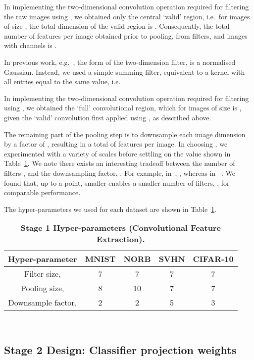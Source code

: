 \documentclass[conference]{IEEEtran}
\begin{document}
In implementing the two-dimensional convolution operation required for filtering the raw images using , we obtained only the central `valid' region, i.e.~for images of size , the total dimension of the valid region is . Consequently, the total number of features per image obtained prior to pooling, from  filters, and images with  channels is .


In previous work, e.g.~\cite{Sermanet.12}, the form of the  two-dimension filter,  is a normalised Gaussian. Instead, we used a simple summing filter, equivalent to a kernel with all entries equal to the same value, i.e.

In implementing the two-dimensional convolution operation required for filtering using , we obtained the `full' convolutional region, which for images of size  is , given the `valid' convolution first applied using , as described above.

The remaining part of the pooling step is to downsample each image dimension by a factor of , resulting in a total of  features per image. In choosing , we experimented with a variety of scales before settling on the value  shown in Table~\ref{Table2}. We note there exists an interesting tradeoff between the number of filters , and the downsampling factor, . For example, in~\cite{Coates.11}, , whereas in~\cite{Le.10} .  We found that, up to a point, smaller  enables a smaller number of filters, , for comparable performance.

The hyper-parameters we used for each dataset are shown in Table~\ref{Table2}.

\begin{table}[!ht]
{\footnotesize
\begin{tabular}{|c|c|c|c|c|}
\hline
Hyper-parameter & MNIST & NORB & SVHN & CIFAR-10\\
\hline
Filter size,  & 7 & 7 & 7 & 7\\
Pooling size,  & 8 & 10 & 7 & 7\\
Downsample factor,   & 2 & 2 & 5 & 3\\
\hline
\end{tabular}
~\\
\caption{\bf{Stage 1 Hyper-parameters (Convolutional Feature Extraction).  }}\label{Table2}
}
\end{table}


\subsection{Stage 2 Design: Classifier projection weights}
\end{document}
